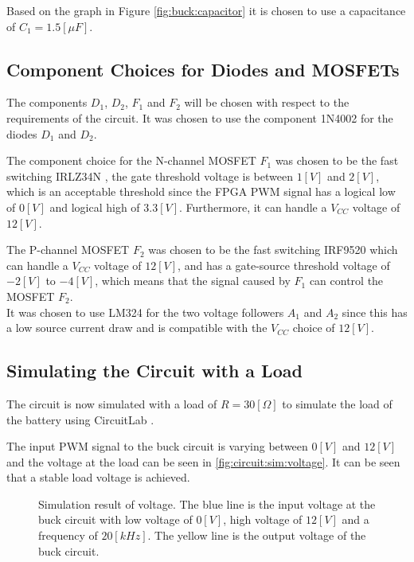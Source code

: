 \documentclass[../report.tex]{subfiles}
\begin{document}
Based on the graph in Figure \ref{fig:buck:capacitor} it is chosen to use a capacitance of $C_1 = 1.5 [\mu F]$.

\subsection{Component Choices for Diodes and MOSFETs} \label{subsec:diodes_mosfets_choices}
The components $D_1$, $D_2$, $F_1$ and $F_2$ will be chosen with respect to the requirements of the circuit.
It was chosen to use the component 1N4002 \cite{1n4002} for the diodes $D_1$ and $D_2$.

The component choice for the N-channel MOSFET $F_1$ was chosen to be the fast switching IRLZ34N \cite{irlz34n}, the gate threshold voltage is between $1 [V]$ and $2 [V]$, which is an acceptable threshold since the FPGA PWM signal has a logical low of $0 [V]$ and logical high of $3.3 [V]$. Furthermore, it can handle a $V_{CC}$ voltage of $12 [V]$.

The P-channel MOSFET $F_2$ was chosen to be the fast switching IRF9520 \cite{irf9520} which can handle a $V_{CC}$ voltage of $12 [V]$, and has a gate-source threshold voltage of $-2 [V]$ to $-4 [V]$, which means that the signal caused by $F_1$ can control the MOSFET $F_2$.\\
It was chosen to use LM324 \cite{lm324} for the two voltage followers $A_1$ and $A_2$ since this has a low source current draw and is compatible with the $V_{CC}$ choice of $12 [V]$.

\subsection{Simulating the Circuit with a Load}
The circuit is now simulated with a load of $R = 30 [\Omega]$ to simulate the load of the battery using CircuitLab \cite{circuitlab}.

The input PWM signal to the buck circuit is varying between $0 [V]$ and $12 [V]$ and the voltage at the load can be seen in \autoref{fig:circuit:sim:voltage}. It can be seen that a stable load voltage is achieved.

\begin{figure}[H]
    \centering
    \noindent{}
    \caption{Simulation result of voltage. The blue line is the input voltage at the buck circuit with low voltage of $0 [V]$, high voltage of $12 [V]$ and a frequency of $20 [kHz]$. The yellow line is the output voltage of the buck circuit.}
    \label{fig:circuit:sim:voltage}
\end{figure}
\end{document}
